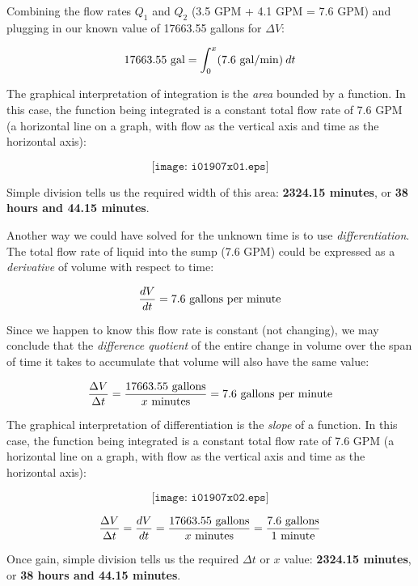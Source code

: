 Combining the flow rates $Q_1$ and $Q_2$ (3.5 GPM + 4.1 GPM = 7.6 GPM) and plugging in our known value of 17663.55 gallons for $\Delta V$:

$$17663.55 \hbox{ gal} = \int_0^{x} (7.6 \hbox{ gal/min}) \> dt$$

The graphical interpretation of integration is the {\it area} bounded by a function.  In this case, the function being integrated is a constant total flow rate of 7.6 GPM (a horizontal line on a graph, with flow as the vertical axis and time as the horizontal axis):

$$\texttt{[image: i01907x01.eps]}$$

Simple division tells us the required width of this area: {\bf 2324.15 minutes}, or {\bf 38 hours and 44.15 minutes}.

\vskip 10pt

\filbreak

Another way we could have solved for the unknown time is to use {\it differentiation}.  The total flow rate of liquid into the sump (7.6 GPM) could be expressed as a {\it derivative} of volume with respect to time:

$${dV \over dt} = 7.6 \hbox{ gallons per minute}$$

Since we happen to know this flow rate is constant (not changing), we may conclude that the {\it difference quotient} of the entire change in volume over the span of time it takes to accumulate that volume will also have the same value:

$${\Delta V \over \Delta t} = {17663.55 \hbox{ gallons} \over x \hbox{ minutes}} = 7.6 \hbox{ gallons per minute}$$

The graphical interpretation of differentiation is the {\it slope} of a function.  In this case, the function being integrated is a constant total flow rate of 7.6 GPM (a horizontal line on a graph, with flow as the vertical axis and time as the horizontal axis):

$$\texttt{[image: i01907x02.eps]}$$

$${\Delta V \over \Delta t} = {dV \over dt} = {17663.55 \hbox{ gallons} \over x \hbox{ minutes}} = {7.6 \hbox{ gallons} \over 1 \hbox{ minute}}$$

Once gain, simple division tells us the required $\Delta t$ or $x$ value: {\bf 2324.15 minutes}, or {\bf 38 hours and 44.15 minutes}.






